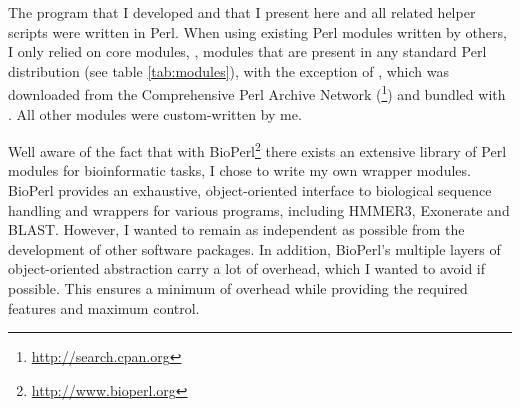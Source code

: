 The program \pname that I developed and that I present here and all related
helper scripts were written in Perl. When using existing Perl modules written
by others, I only relied on core modules, \ie, modules that are present in any
standard Perl distribution (see table \ref{tab:modules}), with the exception of
 \citep{shan2001}, which was downloaded from the Comprehensive
Perl Archive Network (\footnote{\url{http://search.cpan.org}}) and bundled with \pname. All
other modules were custom-written by me.



Well aware of the fact that with BioPerl\footnote{\url{http://www.bioperl.org}}
there exists an extensive library of Perl modules for bioinformatic tasks, I
chose to write my own wrapper modules. BioPerl provides an exhaustive,
object-oriented interface to biological sequence handling and wrappers for
various programs, including HMMER3, Exonerate and BLAST. However, I wanted
\pname to remain as independent as possible from the development of other
software packages. In addition, BioPerl's multiple layers of object-oriented
abstraction carry a lot of overhead, which I wanted to avoid if possible. This
ensures a minimum of overhead while providing the required features and maximum
control.
